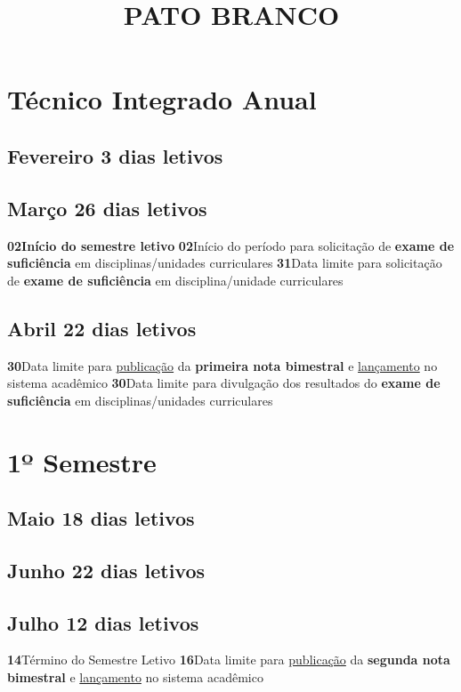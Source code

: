 \documentclass[thesis]{hmcposter}
\author{ }
\title{PATO BRANCO}
\begin{document}
\begin{poster}
\normalsize\section{\color{hmcorange}Técnico Integrado Anual}\subsection{Fevereiro \hfill 3 dias letivos} \null \newline \subsection{Março \hfill 26 dias letivos}\textbf{02}\qquad \textbf{Início do semestre letivo} \newline \textbf{02}\qquad Início do período para solicitação de \textbf{exame de suficiência} em disciplinas/unidades curriculares \newline \textbf{31}\qquad Data limite para solicitação de \textbf{exame de suficiência} em disciplina/unidade curriculares \subsection{Abril \hfill 22 dias letivos}\textbf{30}\qquad Data limite para \underline{publicação} da \textbf{primeira nota bimestral} e \underline{lançamento} no sistema acadêmico \newline \textbf{30}\qquad Data limite para divulgação dos resultados do \textbf{exame de suficiência} em disciplinas/unidades curriculares \vfill\null
\columnbreak
\section{\hfill \color{hmcorange}1º Semestre}
\subsection{Maio \hfill 18 dias letivos} \null \newline \subsection{Junho \hfill 22 dias letivos} \null \newline \subsection{Julho \hfill 12 dias letivos}\textbf{14}\qquad Término do Semestre Letivo \newline \textbf{16}\qquad Data limite para \underline{publicação} da \textbf{segunda nota bimestral} e \underline{lançamento} no sistema acadêmico \newpage

\end{poster}
\end{document}
